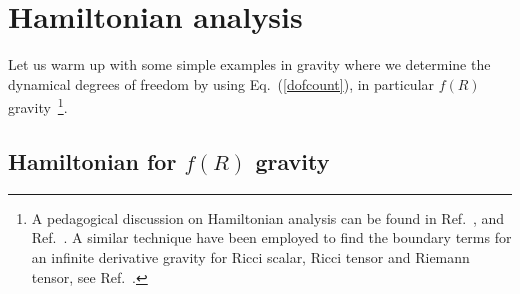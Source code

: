 \documentclass[a4paper,12pt]{article}
\newcommand{\+}{^{\dagger}}
\newcommand{\2}{\frac{1}{2}}
\newcommand{\3}{\frac{1}{3}}
\newcommand{\4}{\frac{1}{4}}
\newcommand{\6}{\frac{1}{6}}
\newcommand{\8}{\frac{1}{8}}
\begin{document}

\section{Hamiltonian analysis}
\label{sec:ham}

Let us warm up with some simple examples in gravity where we determine the dynamical degrees of freedom by 
using Eq.~(\ref{dofcount}), in particular $f(R)$ gravity~\footnote{ A pedagogical discussion on Hamiltonian analysis can be found in Ref.~\cite{Sotiriou:2008rp}, and 
Ref.~\cite{Deruelle:2009zk}. A similar technique have been employed to find the boundary terms for an infinite derivative gravity for 
Ricci scalar, Ricci tensor and Riemann tensor, see Ref.~\cite{Teimouri:2016ulk}.}.
 


\subsection{Hamiltonian for $f(R)$ gravity}
\end{document}

